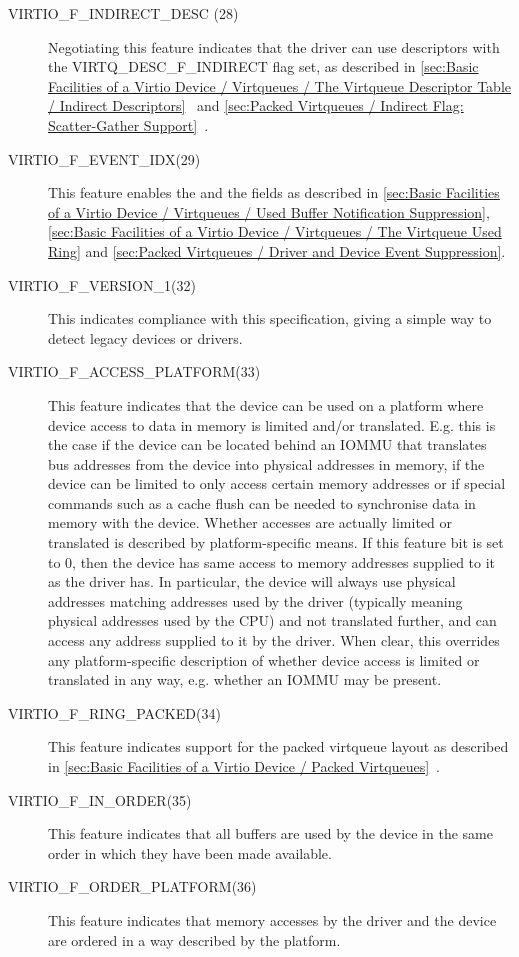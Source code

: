 \begin{description}
  \item[VIRTIO_F_INDIRECT_DESC (28)] Negotiating this feature indicates
  that the driver can use descriptors with the VIRTQ_DESC_F_INDIRECT
  flag set, as described in \ref{sec:Basic Facilities of a Virtio
Device / Virtqueues / The Virtqueue Descriptor Table / Indirect
Descriptors}~ and \ref{sec:Packed Virtqueues / Indirect Flag: Scatter-Gather Support}~.
  \item[VIRTIO_F_EVENT_IDX(29)] This feature enables the 
  and the  fields as described in
\ref{sec:Basic Facilities of a Virtio Device / Virtqueues / Used Buffer Notification Suppression}, \ref{sec:Basic Facilities of a Virtio Device / Virtqueues / The Virtqueue Used Ring} and \ref{sec:Packed Virtqueues / Driver and Device Event Suppression}.


  \item[VIRTIO_F_VERSION_1(32)] This indicates compliance with this
    specification, giving a simple way to detect legacy devices or drivers.

  \item[VIRTIO_F_ACCESS_PLATFORM(33)] This feature indicates that
  the device can be used on a platform where device access to data
  in memory is limited and/or translated. E.g. this is the case if the device can be located
  behind an IOMMU that translates bus addresses from the device into physical
  addresses in memory, if the device can be limited to only access
  certain memory addresses or if special commands such as
  a cache flush can be needed to synchronise data in memory with
  the device. Whether accesses are actually limited or translated
  is described by platform-specific means.
  If this feature bit is set to 0, then the device
  has same access to memory addresses supplied to it as the
  driver has.
  In particular, the device will always use physical addresses
  matching addresses used by the driver (typically meaning
  physical addresses used by the CPU)
  and not translated further, and can access any address supplied to it by
  the driver. When clear, this overrides any platform-specific description of
  whether device access is limited or translated in any way, e.g.
  whether an IOMMU may be present.
  \item[VIRTIO_F_RING_PACKED(34)] This feature indicates
  support for the packed virtqueue layout as described in
  \ref{sec:Basic Facilities of a Virtio Device / Packed Virtqueues}~.
  \item[VIRTIO_F_IN_ORDER(35)] This feature indicates
  that all buffers are used by the device in the same
  order in which they have been made available.
  \item[VIRTIO_F_ORDER_PLATFORM(36)] This feature indicates
  that memory accesses by the driver and the device are ordered
  in a way described by the platform.


\end{description}
